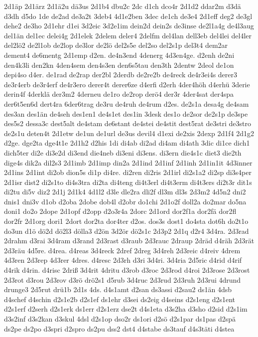 {2d1äp
2d1ärz
2d1ä2u
dä3us
2d1b4
dbu2c
2dc
d1ch
dco4r
2d1d2
ddar2m
d3dä
d3dh
d5do
1de
de2ad
de3a2t
3deb4
4d1e2ben
3dec
de1ch
de3e4
2d1eff
deg2
de3gl
dehe2
de3ho
2d1ehr
d1ei
3d2eic
3d2e1im
dein2d
dein2s
de3inse
de2l1a4g
de4l3aug
del1än
del1ec
delei4g
2d1elek
2delem
deler4
2delfm
del4lan
dell3eb
del4lei
del4ler
del2lö2
de2l1ob
de2lop
de3lor
de2lö
del2s5e
del2so
del2s1p
del3t4
dem2ar
dement4
de6mentg
2d1emp
d2en.
de4n3end
4denerg
4d3en4ge.
d2enh
de2ni
den4k3li
den2kn
4den4sem
den4s3en
den6s5tau
den3th
2dentw
2deol
de1on
depi4so
d4er.
de1rad
de2rap
der2bl
2derdb
de2re2b
de4reck
de4r3ei4s
derer3
de3r4erb
de3r4erf
de4r3ero
derer4t
derer6ze
d4erfi
d2erh
4der4höh
d4erhü
3derie
derin4f
4derklä
der3m2
4derneu
de1ro
de2rop
derö4
der3r
4der4sat
der4spa
der6t5en6d
dert4ra
6der6trag
de3ru
de4ruh
de4rum
d2es.
de2s1a
desa4g
de4sam
des3an
des1än
de4seh
des1en1
de4s1et
des1in
3desk
des1o
de2sor
de2s1p
de3spe
des5s2
dessa3c
dest5alt
de4stam
de6stant
de4stei
de4stit
dest5rat
de3stri
de3stro
de2s1u
deten4t
2d1etw
de1un
de1url
de3us
devil4
d1exi
de2xis
2dexp
2d1f4
2d1g2
d2ge.
dge2ta
dge4t1e
2d1h2
d2his
1di
di4ab
di2ad
di4am
di4ath
3dic
di1ce
dich1
dich5ter
di2e
di3e2d
di3end
die4neb
di3eni
di3ens.
di3ern
die4s1c
diet3
die2th
dige4s
dik2a
dil2s3
2d1imb
2d1imp
din2a
2d1ind
2d1inf
2d1inh
2d1in1it
4d3inner
2d1ins
2d1int
di2ob
dion5s
di1p
di4re.
di2ren
di2ris
2d1irl
di2s1a2
di2sp
di3s4per
2d1isr
dist2
di2s1to
di4s3tra
di2ta
di4teng
di4t3erl
di4t3erm
di4t3ers
di2t3r
dit1s
di2tu
di5v
diz2
2d1j
2d1k4
4d1l2
d3le
dle2ra
dli2f
dl3m
dl3s
2d3m2
4d5n2
dni2
dnis1
dni3v
d1ob
d2oba
2dobe
dob4l
d2obr
do1chi
2d1o2f
doll2a
do2mar
do5na
doni1
do2o
2dope
2d1opf
d2opp
d2o3r4a
2dorc
2d1ord
dor2f1a
dor2fä
dor2fl
dor2fr
2d1org
dori1
2dort
dor2ta
dor4ter
d2os.
dos3s
dost1
do4sta
dot6h
do2t1o
do3un
d1ö
dö2d
dö2l3
dölla3
d2ön
3d2ör
dö2s1c
2d3p2
2d1q
d2r4
3d4ra.
2d3rad
2drahm
d3rai
3d4ram
d3rand
2d3rast
d3raub
2d3rauc
2draup
2dräd
d4räh
2d3rät
2d3räu
4d5re.
d4rea.
d4reas
3d4reck
2dref
2dreg
3d4reh
2d3reic
d4reiv
4drem
4d3ren
2d3rep
4d3rer
4dres.
d4resc
2d3rh
d3ri
3d4ri.
3d4ria
2d5ric
d4rid
d4rif
d4rik
d4rin.
d4risc
2driß
3d4rit
4dritu
d3rob
d3roc
2d3rod
d4roi
2d3rose
2d3rost
2d3rot
d3rou
2d3rov
d3rö
drö2s1
d5rub
3d4ruc
2d3rud
2d3ruh
2d3rui
4drund
drunge3
2d5rut
drü1b
2d1s
4ds.
d4s1amt
d2san
ds3assi
d2sau2
ds1än
4dsb
d4schef
d4schin
d2s1e2b
d2s1ef
ds1ehr
d3sei
ds2eig
d4seins
d2s1eng
d2s1ent
d2s1erf
d2serh
d2s1erk
ds1err
d2s1erz
dse2t
d4s1eta
d3s2ha
d3sho
d2sid
d2s1im
d3s2inf
d3s2kan
d3skul
4dsl
d2s1op
dso2r
ds1ori
d2sö
d2s1par
ds1pas
d2spä
ds2pe
ds2po
d3spri
d2spro
ds2pu
dss2
dst4
d4stabe
ds3tauf
d4s3täti
d4stea
}
